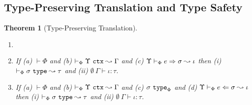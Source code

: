 \documentclass[12pt]{article}
\newtheorem{theorem}{Theorem}
\begin{document}
\subsection{Type-Preserving Translation and Type Safety}
\begin{theorem}[Type-Preserving Translation] 
\label{thm:type-preserving-translation}
\begin{enumerate}
\item[] ~
\item[1)] If (a) $\vdash \Phi$ and (b) $\vdash_{\Phi} \Upsilon~\mathtt{ctx} \leadsto \Gamma$ and (c) $\Upsilon \vdash_{\Phi} e \Rightarrow \sigma \leadsto \iota$ then (i) $\vdash_{\Phi} \sigma~\mathtt{type} \leadsto \tau$ and (ii) $\emptyset~\Gamma \vdash \iota : \tau$.
\item[2)] If (a) $\vdash \Phi$ and (b) $\vdash_{\Phi} \Upsilon~\mathtt{ctx} \leadsto \Gamma$ and (c) $\sigma~\mathtt{type}_{\Phi}$ and (d) $\Upsilon \vdash_{\Phi} e \Leftarrow \sigma \leadsto \iota$ then (i) $\vdash_{\Phi} \sigma~\mathtt{type} \leadsto \tau$ and (ii) $\emptyset~\Gamma \vdash \iota : \tau$.
\end{enumerate}
\end{theorem}
\end{document}

